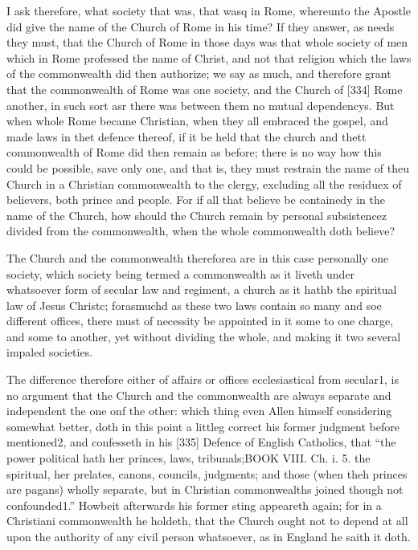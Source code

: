 I ask therefore, what society that was, that wasq in Rome, whereunto the Apostle did give the name of the Church of Rome in his time? If they answer, as needs they must, that the Church of Rome in those days was that whole society of men which in Rome professed the name of Christ, and not that religion which the laws of the commonwealth did then authorize; we say as much, and therefore grant that the commonwealth of Rome was one society, and the Church of [334] Rome another, in such sort asr there was between them no mutual dependencys. But when whole Rome became Christian, when they all embraced the gospel, and made laws in thet defence thereof, if it be held that the church and thett commonwealth of Rome did then remain as before; there is no way how this could be possible, save only one, and that is, they must restrain the name of theu Church in a Christian commonwealth to the clergy, excluding all the residuex of believers, both prince and people. For if all that believe be containedy in the name of the Church, how should the Church remain by personal subsistencez divided from the commonwealth, when the whole commonwealth doth believe?

The Church and the commonwealth thereforea are in this case personally one society, which society being termed a commonwealth as it liveth under whatsoever form of secular law and regiment, a church as it hathb the spiritual law of Jesus Christc; forasmuchd as these two laws contain so many and soe different offices, there must of necessity be appointed in it some to one charge, and some to another, yet without dividing the whole, and making it two several impaled societies.

The difference therefore either of affairs or offices ecclesiastical from secular1, is no argument that the Church and the commonwealth are always separate and independent the one onf the other: which thing even Allen himself considering somewhat better, doth in this point a littleg correct his former judgment before mentioned2, and confesseth in his [335] Defence of English Catholics, that “the power political hath her princes, laws, tribunals;BOOK VIII. Ch. i. 5. the spiritual, her prelates, canons, councils, judgments; and those (when theh princes are pagans) wholly separate, but in Christian commonwealths joined though not confounded1.” Howbeit afterwards his former sting appeareth again; for in a Christiani commonwealth he holdeth, that the Church ought not to depend at all upon the authority of any civil person whatsoever, as in England he saith it doth.


